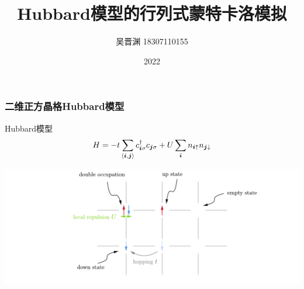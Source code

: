 \documentclass[UTF8]{ctexbeamer}
\title{Hubbard模型的行列式蒙特卡洛模拟}
\author{吴晋渊 18307110155}
\institute{复旦大学物理学系}
\date{2022}
\newcommand{\pair}[1]{\langle #1 \rangle}
\begin{document}
\frame{\titlepage}

\begin{frame}
\frametitle{二维正方晶格Hubbard模型}

Hubbard模型
\begin{equation}
    H = - t\sum_{\pair{\vb*{i}, \vb*{j}}} c^\dagger_{\vb*{i} \sigma} c_{\vb*{j} \sigma} + U \sum_{\vb*{i}} n_{\vb*{i} \uparrow} n_{\vb*{j} \downarrow}
\end{equation}    
\begin{center}
    \includegraphics[width=\textwidth]{hubbard.pdf}
\end{center}

\end{frame}
\end{document}
